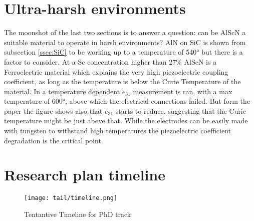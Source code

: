 \section{Ultra-harsh environments}
The moonshot of the last two sections is to answer a question: can be AlScN a suitable material to operate in harsh environments? AlN on SiC is shown from subsection \ref{ssec:SiC} to be working up to a temperature of 540° but there is a factor to consider. At a Sc concentration higher than 27\% AlScN is a Ferroelectric material \cite{fichtner_alscn_2019} which explains the very high piezoelectric coupling coefficient, as long as the temperature is below the Curie Temperature of the material. In \cite{fichtner_alscn_2019} a temperature dependent $ e_{31} $ measurement is ran, with a max temperature of 600°, above which the electrical connections failed. But form the paper the figure shows also that $ e_{31} $ starts to reduce, suggesting that the Curie temperature might be just above that. While the electrodes can be easily made with tungsten to withstand high temperatures \cite{verbrugghe_study_2017} the piezoelectric coefficient degradation is the critical point.
\pagebreak
\section{Research plan timeline}
\begin{figure}[h!]
	\centering
	\texttt{[image: tail/timeline.png]}
	\caption{Tentantive Timeline for PhD track}
\end{figure}

